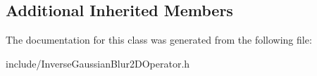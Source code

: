\subsection*{Additional Inherited Members}


The documentation for this class was generated from the following file\+:\begin{DoxyCompactItemize}
\item 
include/Inverse\+Gaussian\+Blur2\+D\+Operator.\+h\end{DoxyCompactItemize}
